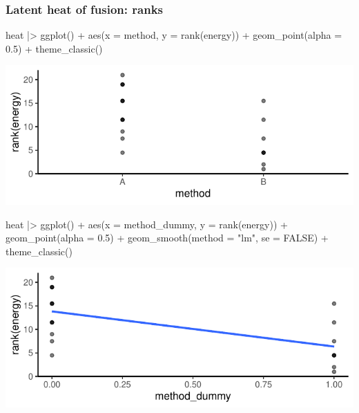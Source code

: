 \documentclass[a4paper]{article}
\begin{document}
\subsubsection{Latent heat of fusion: ranks}
\begin{Schunk}
\begin{Sinput}
heat |> ggplot() +
  aes(x = method, y = rank(energy)) + 
  geom_point(alpha = 0.5) +
  theme_classic()
\end{Sinput}


{\centering \includegraphics[width=\maxwidth]{figure/listings-unnamed-chunk-195-1} 

}

\begin{Sinput}
heat |> ggplot() +
  aes(x = method_dummy, 
      y = rank(energy)) + 
  geom_point(alpha = 0.5) + 
  geom_smooth(method = "lm",
              se = FALSE) +
  theme_classic()
\end{Sinput}


{\centering \includegraphics[width=\maxwidth]{figure/listings-unnamed-chunk-195-2} 

}

\end{Schunk}
\end{document}
